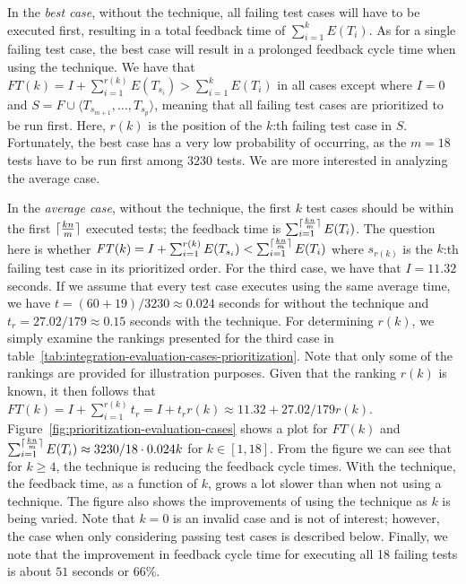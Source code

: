 \documentclass[a4paper,english,12pt]{report}
\DeclarePairedDelimiter{\ceil}{\lceil}{\rceil}
\begin{document}
In the \textit{best case}, without the technique, all failing test cases will have to be executed first, resulting in a total feedback time of $\sum_{i=1}^{k} E(T_i)$. As for a single failing test case, the best case will result in a prolonged feedback cycle time when using the technique. We have that $\mathit{FT}(k) = I + \sum_{i=1}^{r(k)} E(T_{s_i}) > \sum_{i=1}^{k} E(T_i)$ in all cases except where $I=0$ and $S=F\cup\langle T_{s_{m+1}},\ldots,T_{s_{p}} \rangle$, meaning that all failing test cases are prioritized to be run first. Here, $r(k)$ is the position of the $k$:th failing test case in $S$. Fortunately, the best case has a very low probability of occurring, as the $m=18$ tests have to be run first among $3230$ tests. We are more interested in analyzing the average case.

In the \textit{average case}, without the technique, the first $k$ test cases should be within the first $\ceil{\frac{kn}{m}}$ executed tests; the feedback time is $\sum_{i=1}^{\ceil{\frac{kn}{m}}} E(T_i)$. The question here is whether $\mathit{FT}(k) = I + \sum_{i=1}^{r(k)} E(T_{s_i}) < \sum_{i=1}^{\ceil{\frac{kn}{m}}} E(T_i)$ where $s_{r(k)}$ is the $k$:th failing test case in its prioritized order. For the third case, we have that $I=11.32$ seconds. If we assume that every test case executes using the same average time, we have $t=(60+19)/3230\approx 0.024$ seconds for without the technique and $t_r=27.02/179\approx 0.15$ seconds with the technique. For determining $r(k)$, we simply examine the rankings presented for the third case in table~\vref{tab:integration-evaluation-cases-prioritization}. Note that only some of the rankings are provided for illustration purposes. Given that the ranking $r(k)$ is known, it then follows that $\mathit{FT}(k) = I + \sum_{i=1}^{r(k)} t_r = I + t_r r(k)\approx 11.32+27.02/179 r(k)$. Figure~\vref{fig:prioritization-evaluation-cases} shows a plot for $\mathit{FT}(k)$ and $\sum_{i=1}^{\ceil{\frac{kn}{m}}} E(T_i)\approx 3230/18\cdot 0.024k$ for $k\in[1, 18]$. From the figure we can see that for $k\geq 4$, the technique is reducing the feedback cycle times. With the technique, the feedback time, as a function of $k$, grows a lot slower than when not using a technique. The figure also shows the improvements of using the technique as $k$ is being varied. Note that $k=0$ is an invalid case and is not of interest; however, the case when only considering passing test cases is described below. Finally, we note that the improvement in feedback cycle time for executing all 18 failing tests is about $51$ seconds or $66\%$.
\end{document}
